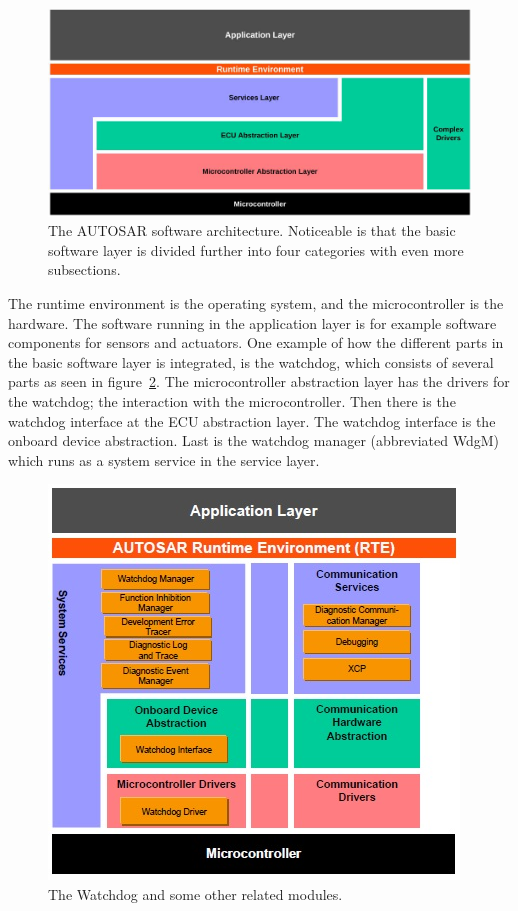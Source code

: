 \begin{figure}[!ht]
  \begin{center}
    \includegraphics[keepaspectratio, width=\linewidth]{pictures/autosar_architecture.jpg}
  \end{center}
  \caption{The AUTOSAR software architecture. Noticeable is that the basic
    software layer is divided further into four categories with even more subsections.}
  \label{FIG:AUTOSAR:architecture}
\end{figure}

The runtime environment is the operating system, and the
microcontroller is the hardware. The software running in the
application layer is for example software components for sensors and
actuators. One example of how the different parts in the basic
software layer is integrated, is the watchdog, which consists of
several parts as seen in figure~\ref{FIG:AUTOSAR:watchdog}. The
microcontroller abstraction layer has the drivers for the watchdog;
the interaction with the microcontroller. Then there is the watchdog
interface at the ECU abstraction layer. The watchdog interface is the
onboard device abstraction. Last is the watchdog manager (abbreviated
WdgM) which runs as a system service in the service layer. \cite{AUTOSAR:LayeredSoftwareArchitecture}

\begin{figure}[!ht]
  \begin{center}
    \includegraphics{pictures/watchdog_architecture.jpg}
  \end{center}
  \caption{The Watchdog and some other related modules.}
  \label{FIG:AUTOSAR:watchdog}
\end{figure}

